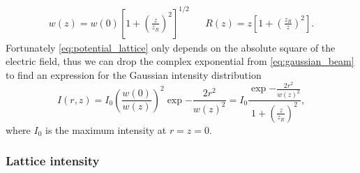 \begin{align}
  w{(z)}
  =
  w{(0)}{\left[1+{\left(\frac{z}{z_R}\right)}^2\right]}^{1/2}
  &&
  R{(z)}=z{\left[1+{\left(\frac{z_R}{z}\right)}^2\right]}
  \label{eq:gaussian_beam_evolvement}.
\end{align}
Fortunately \cref{eq:potential_lattice} only depends on the absolute
square of the electric field, thus we can drop the complex exponential from
\cref{eq:gaussian_beam} to find an expression for the Gaussian intensity
distribution
\begin{equation}
  I(r,z)
  =
  I_0
  {\left(\frac{w(0)}{w(z)}\right)}^2
  \exp{-\frac{2r^2}{w{(z)}^2}}
  =
  I_0
  \frac{\exp{-\frac{2r^2}{w{(z)}^2}}}{1+{\left(\frac{z}{z_R}\right)}^2}
  \label{eq:gaussian_intensity},
\end{equation}
where $I_0$ is the maximum intensity at $r=z=0$.

\subsubsection{Lattice intensity}

